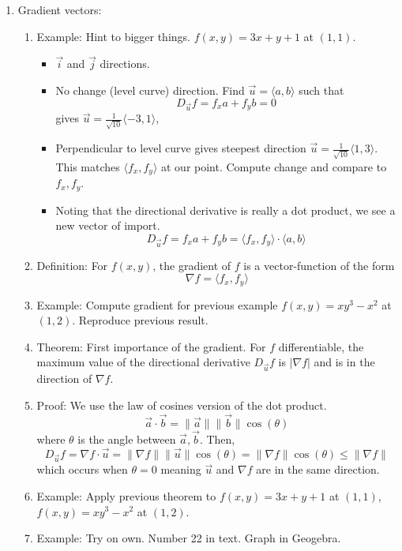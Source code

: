 \documentclass{article}
\begin{document}
\begin{enumerate}
\item Gradient vectors:
\begin{enumerate}
\item Example: Hint to bigger things. $f(x,y)=3x+y+1$ at $(1,1)$.
\begin{itemize}
\item $\vec{i}$ and $\vec{j}$ directions.
\item No change (level curve) direction. Find $\vec{u} = \langle a,b \rangle$ such that 
\[
D_{\vec{u}} f = f_x a + f_y b = 0
\]
gives $\vec{u} = \frac{1}{\sqrt{10}}\langle -3,1 \rangle$,
\item Perpendicular to level curve gives steepest direction $\vec{u} = \frac{1}{\sqrt{10}}\langle 1, 3 \rangle$. This matches $\langle f_x, f_y \rangle$ at our point. Compute change and compare to $f_x, f_y$.
\item Noting that the directional derivative is really a dot product, we see a new vector of import.
\[
D_{\vec{u}} f = f_x a + f_y b  = \langle f_x, f_y \rangle \cdot \langle a,b \rangle
\] 
\end{itemize}
\item Definition: For $f(x,y)$, the gradient of $f$ is a vector-function of the form
\[
\nabla f = \langle f_x, f_y \rangle
\]
\item Example: Compute gradient for previous example $f(x,y)=xy^3-x^2$ at $(1,2)$. Reproduce previous result.
\item Theorem: First importance of the gradient. For $f$ differentiable, the maximum value of the directional derivative $D_{\vec{u}} f$ is $|\nabla f|$ and is in the direction of $\nabla f$.
\item Proof: We use the law of cosines version of the dot product.
\[
\vec{a} \cdot \vec{b} = \|\vec{a}\| \|\vec{b}\| \cos(\theta)
\]
where $\theta$ is the angle between $\vec{a}, \vec{b}$. Then,
\[
D_{\vec{u}} f = \nabla f \cdot \vec{u} = \|\nabla f\| \|\vec{u}\| \cos(\theta) = \|\nabla f\| \cos(\theta) \leq \|\nabla f\|
\]
which occurs when $\theta=0$ meaning $\vec{u}$ and $\nabla f$ are in the same direction.
\item Example: Apply previous theorem to  $f(x,y)=3x+y+1$ at $(1,1)$,  $f(x,y)=xy^3-x^2$ at $(1,2)$. 
\item Example: Try on own. Number 22 in text. Graph in Geogebra.
\end{enumerate}


\end{enumerate}
\end{document}

